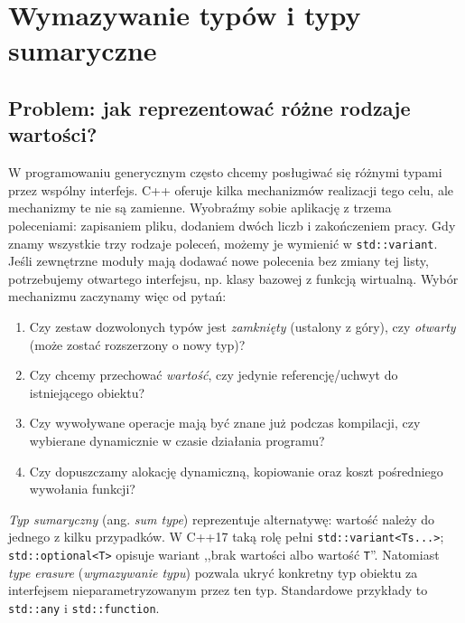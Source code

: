 
\chapter{Wymazywanie typów i typy sumaryczne}
\label{chap:cpp14-type-erasure}

\section{Problem: jak reprezentować różne rodzaje wartości?}

W programowaniu generycznym często chcemy posługiwać się różnymi typami
przez wspólny interfejs. C++ oferuje kilka mechanizmów realizacji tego celu,
ale mechanizmy te nie są zamienne.
Wyobraźmy sobie aplikację z trzema poleceniami: zapisaniem pliku,
dodaniem dwóch liczb i zakończeniem pracy. Gdy znamy wszystkie trzy
rodzaje poleceń, możemy je wymienić w \texttt{std::variant}. Jeśli
zewnętrzne moduły mają dodawać nowe polecenia bez zmiany tej listy,
potrzebujemy otwartego interfejsu, np. klasy bazowej z funkcją wirtualną.
Wybór mechanizmu zaczynamy więc od pytań:
\begin{enumerate}
\item Czy zestaw dozwolonych typów jest \emph{zamknięty} (ustalony z góry),
      czy \emph{otwarty} (może zostać rozszerzony o nowy typ)?
\item Czy chcemy przechować \emph{wartość}, czy jedynie referencję/uchwyt
      do istniejącego obiektu?
\item Czy wywoływane operacje mają być znane już podczas kompilacji,
      czy wybierane dynamicznie w czasie działania programu?
\item Czy dopuszczamy alokację dynamiczną, kopiowanie oraz koszt
      pośredniego wywołania funkcji?
\end{enumerate}

\emph{Typ sumaryczny} (ang. \emph{sum type}) reprezentuje alternatywę:
wartość należy do jednego z kilku przypadków. W C++17 taką rolę pełni
\texttt{std::variant<Ts...>}; \texttt{std::optional<T>} opisuje wariant
,,brak wartości albo wartość \texttt{T}''. Natomiast \emph{type erasure}
(\emph{wymazywanie typu}) pozwala ukryć konkretny typ obiektu za
interfejsem nieparametryzowanym przez ten typ. Standardowe przykłady
to \texttt{std::any} i \texttt{std::function}.

